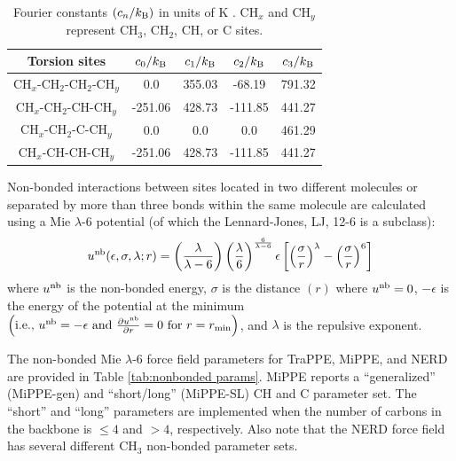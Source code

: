 \documentclass[journal=jced,manuscript=article]{achemso}
\begin{document}
    \begin{table}[h!]
    	\caption{Fourier constants $(c_n/k_{\rm B})$ in units of K \cite{Martin1999}. CH$_x$ and CH$_y$ represent CH$_3$, CH$_2$, CH, or C sites.} \label{tab:torsions}
    	\begin{center}
    		\begin{tabular}{|c|c|c|c|c|}
    			\hline
    			Torsion sites & $c_0/k_{\rm B}$ & $c_1/k_{\rm B}$ & $c_2/k_{\rm B}$ & $c_3/k_{\rm B}$ \\ \hline
    			CH$_x$-CH$_2$-CH$_2$-CH$_y$ & 0.0 & 355.03 & -68.19 & 791.32 \\ 
    			CH$_x$-CH$_2$-CH-CH$_y$ & -251.06 & 428.73 & -111.85 & 441.27 \\
    			CH$_x$-CH$_2$-C-CH$_y$ & 0.0 & 0.0 & 0.0 & 461.29 \\
    			CH$_x$-CH-CH-CH$_y$ & -251.06 & 428.73 & -111.85 & 441.27 \\
    			\hline
    		\end{tabular}
    	\end{center} 
    \end{table}
    
    Non-bonded interactions between sites located in two different molecules or separated by more than three bonds within the same molecule are calculated using a Mie $\lambda$-6 potential (of which the Lennard-Jones, LJ, 12-6 is a subclass):
    \begin{equation} \label{eq:Mie}
    u^{\rm nb}(\epsilon,\sigma,\lambda;r) = \left(\frac{\lambda}{\lambda - 6}\right)\left(\frac{\lambda}{6}\right)^{\frac{6}{\lambda - 6}} \epsilon \left[\left(\frac{\sigma}{r}\right)^{\lambda} - \left(\frac{\sigma}{r}\right)^6\right]
    \end{equation} 
    where $u^{\rm nb}$ is the non-bonded energy, $\sigma$ is the distance $(r)$ where $u^{\rm nb} = 0$, $-\epsilon$ is the energy of the potential at the minimum $\left(\text{i.e., }u^{\rm nb} = -\epsilon \text{ and } \frac{\partial u^{\rm nb}}{\partial r} = 0 \text{ for } r=r_{\rm min} \right)$, and $\lambda$ is the repulsive exponent. 
    
    The non-bonded Mie $\lambda$-6 force field parameters for TraPPE, MiPPE, and NERD are provided in Table \ref{tab:nonbonded params}. MiPPE reports a ``generalized'' (MiPPE-gen) and ``short/long'' (MiPPE-SL) CH and C parameter set. The ``short'' and ``long'' parameters are implemented when the number of carbons in the backbone is $\le 4$ and $> 4$, respectively. Also note that the NERD force field has several different CH$_3$ non-bonded parameter sets.
    
\end{document}
